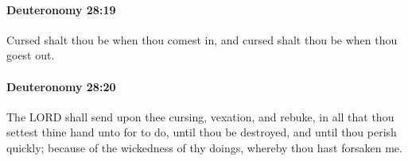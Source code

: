 		\paragraph{Deuteronomy 28:19} %
			\label{DEUTERONOMY-28-19}

			Cursed shalt thou be when thou comest in, and cursed shalt thou be when thou goest out.


		\paragraph{Deuteronomy 28:20} %
			\label{DEUTERONOMY-28-20}

			The LORD shall send upon thee cursing, vexation, and rebuke, in all that thou settest thine hand unto for to do, until thou be destroyed, and until thou perish quickly; because of the wickedness of thy doings, whereby thou hast forsaken me.


